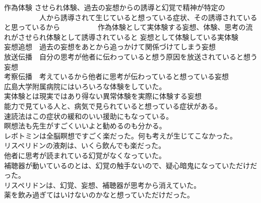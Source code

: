 \documentclass{jsarticle}
\begin{document}
\title{}
\author{}
\date{}
\maketitle




作為体験  させられ体験、過去の妄想からの誘導と幻覚で精神が特定の 
　　　　　人から誘導されて生じていると想っている症状、その誘導されていると思っているから 
　　　　　作為体験として実体験する妄想、体験、思考の流れがさせられ体験として誘導されていると
          妄想として体験している実体験\\
妄想追想　過去の妄想をあとから追っかけて関係づけてしまう妄想\\ 
放送伝播　自分の思考が他者に伝わっていると想う原因を放送されていると想う妄想\\ 
考察伝播　考えているから他者に思考が伝わっていると想っている妄想\\ 
広島大学附属病院にはいろいろな体験をしていた。\\
実体験とは現実ではあり得ない異常体験を実際に体験する妄想\\ 
能力で見ている人と、病気で見られていると想っている症状がある。\\ 
速読法はこの症状の緩和のいい援助にもなっている。\\ 
瞑想法も先生がすごくいいよと勧めるのも分かる。 \\ 
レボトミンは全脳瞑想ですごく楽だった。何も考えが生じてこなかった。\\
リスペリドンの液剤は、いくら飲んでも楽だった。\\
他者に思考が読まれている幻覚がなくなっていた。\\ 
補聴器が動いているのとは、幻覚の触手ないので、疑心暗鬼になっていただけだった。\\ 
リスペリドンは、幻覚、妄想、補聴器が思考から消えていた。\\ 
薬を飲み過ぎてはいけないのかなと想っていただけだった。\\
\end{document}
